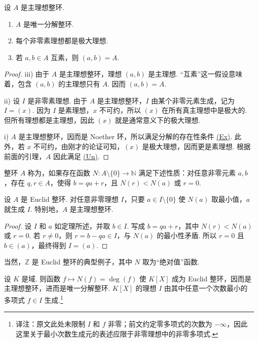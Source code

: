 \begin{theorem*}
设 $A$ 是主理想整环.
\begin{enumerate}[label=\roman*)]
\item $A$ 是唯一分解整环.
\item 每个非零素理想都是极大理想.
\item 若 $a,b\in A$ 互素，则 $(a,b)=A$.
\end{enumerate}
\end{theorem*}
\begin{proof}
iii) 由于 $A$ 是主理想整环，理想 $(a,b)$ 是主理想. ``互素''这一假设意味着，包含 $(a,b)$ 的主理想只有 $A$. 因而 $(a,b)=A$.

 ii) 设 $I$ 是非零素理想. 由于 $A$ 是主理想整环，$I$ 由某个非零元素生成，记为 $I=(x)$. 因为 $I$ 是素理想，$x$ 不可约，所以 $(x)$ 在所有真主理想中是极大的. 但所有理想都是主理想，因此 $(x)$ 就是通常意义下的极大理想.

 i) $A$ 是主理想整环，因而是 Noether 环，所以满足分解的存在性条件 \hyperlink{galois-factorization-ex}{(Ex)}. 此外，若 $x$ 不可约，由刚才的论证可知，$(x)$ 是极大理想，因而更是素理想. 根据前面的引理，$A$ 因此满足 \hyperlink{galois-factorization-un}{(Un)}.
\end{proof}

\begin{definition*}
整环 $A$ 称为，如果存在函数 $N\colon A\setminus\{0\}\longrightarrow\mathbb N$ 满足下述性质：对任意非零元素 $a,b$，存在 $q,r\in A$，使得 $b=qa+r$，且 $N(r)<N(a)$ 或 $r=0$.
\end{definition*}

\begin{theorem*}
设 $A$ 是 Euclid 整环. 对任意非零理想 $I$，只要 $a\in I\setminus\{0\}$ 使 $N(a)$ 取最小值，$a$ 就生成 $I$. 特别地，$A$ 是主理想整环.
\end{theorem*}
\begin{proof}
设 $I$ 和 $a$ 如定理所述，并取 $b\in I$. 写成 $b=qa+r$，其中 $N(r)<N(a)$ 或 $r=0$. 若 $r\ne0$，则 $r=b-qa\in I$，与 $N(a)$ 的最小性矛盾. 所以 $r=0$ 且 $b\in(a)$，最终得到 $I=(a)$.
\end{proof}

当然，$\mathbb Z$ 是 Euclid 整环的典型例子，其中 $N$ 取为``绝对值''函数.

\begin{example*}
设 $K$ 是域. 则函数 $f\mapsto N(f)=\deg(f)$ 使 $K[X]$ 成为 Euclid 整环，因而是主理想整环，进而是唯一分解整环. $K[X]$ 的理想 $I$ 由其中任意一个次数最小的多项式 $f\in I$ 生成.\footnote{译注：原文此处未限制 $I$ 和 $f$ 非零；前文约定零多项式的次数为 $-\infty$，因此这里关于最小次数生成元的表述应限于非零理想中的非零多项式.}
\end{example*}

